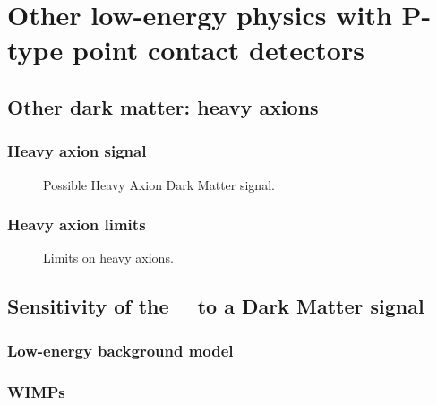 \chapter{Other low-energy physics with P-type point contact detectors}

		
	\section{Other dark matter: heavy axions}
	\label{sec:CalcLimitsOnHeavyAxions}		
		


	\subsection{Heavy axion signal}
	\label{sec:CalcLimitsOnHeavyAxionSignal}		

		\begin{figure}
			\centering
			\caption{Possible Heavy Axion Dark Matter signal.}
			\label{fig:HeavyAxionSignal}
		\end{figure}

	\subsection{Heavy axion limits}
	\label{sec:CalcLimitsOnHeavyAxionLimits}		
				
		\begin{figure}
			\centering
			\caption{Limits on heavy axions.}
			\label{fig:HeavyAxionSignal}
		\end{figure}
		
							
	\section{Sensitivity of the \MJ~\minmod~to a Dark Matter signal}
	\label{sec:MJSensitivity}
	
		\subsection{Low-energy background model}
		\label{sec:MJLowEnergyBackgroundModel}
		
		\subsection{WIMPs}
		\label{sec:MJSensitivityToWIMP}
		
